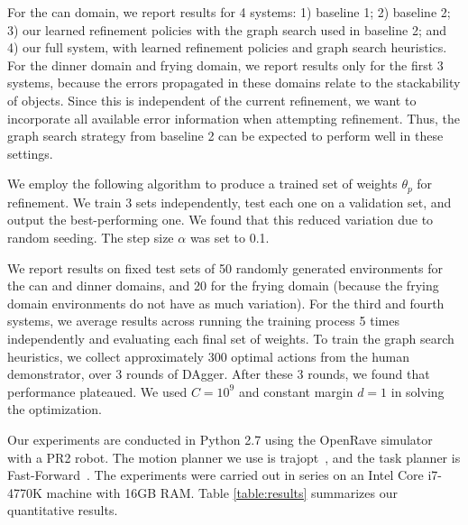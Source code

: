 For the can domain, we report results for 4 systems: 1) baseline 1; 2) baseline 2; 3) our learned refinement policies
with the graph search used in baseline 2; and 4) our full system, with learned refinement policies and graph search heuristics.
For the dinner domain and frying domain, we report results only for the first 3 systems, because the errors propagated in these
domains relate to the stackability of objects. Since this is independent of the current refinement, we want to
incorporate all available error information when attempting refinement. Thus, the graph search strategy
from baseline 2 can be expected to perform well in these settings.

We employ the following algorithm to produce a trained set of weights $\theta_{p}$ for refinement. We train 3 sets independently,
test each one on a validation set, and output the best-performing one. We found that this
reduced variation due to random seeding. The step size $\alpha$ was set to 0.1.

We report results on fixed test sets of 50 randomly generated environments for the can and dinner domains,
and 20 for the frying domain (because the frying domain environments do not have as much variation).
For the third and fourth systems, we average results across running the training
process 5 times independently and evaluating each final set of weights. To train the graph search heuristics,
we collect approximately 300 optimal actions from the human demonstrator, over 3 rounds of DAgger. After these 3 rounds,
we found that performance plateaued. We used $C = 10^{9}$ and constant margin $d = 1$ in solving the optimization.

Our experiments are conducted in Python 2.7 using the OpenRave simulator~\cite{Diankov_2008_6117} with a PR2 robot.
The motion planner we use is trajopt~\cite{schulman2013finding}, and the task planner is Fast-Forward~\cite{FF}.
The experiments were carried out in series on an Intel Core i7-4770K machine with 16GB RAM.
Table \ref{table:results} summarizes our quantitative results.

